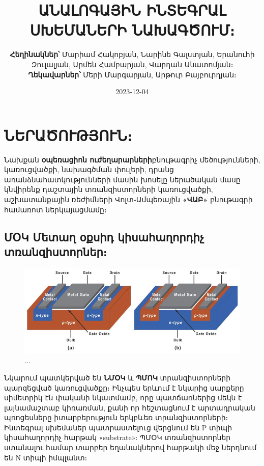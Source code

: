 \documentclass[
]{book}
\title{ԱՆԱԼՈԳԱՅԻՆ ԻՆՏԵԳՐԱԼ ՍԽԵՄԱՆԵՐԻ ՆԱԽԱԳԾՈՒՄ։}
\author{\textbf{Հեղինակներ՝} Մարիամ Հակոբյան, Նարինե Գալստյան, Երանուհի
Զուլալյան, Արմեն Համբարյան, Վարդան Անատոմյան։ \textbf{Ղեկավարներ՝} Մերի
Մարգարյան, Արթուր Բայբուրդյան։}
\date{2023-12-04}
\begin{document}
\frontmatter
\maketitle

\mainmatter
\hypertarget{ux576ux565ux580ux561ux56eux578ux582ux569ux575ux578ux582ux576}{%
\chapter{ՆԵՐԱԾՈՒԹՅՈՒՆ։}\label{ux576ux565ux580ux561ux56eux578ux582ux569ux575ux578ux582ux576}}

Նախքան \textbf{օպեռացիոն ուժեղարարների}բնութագրիչ մեծությունների,
կառուցվածքի, նախագծման փուլերի, դրանց առանձնահատկությունների մասին
խոսելը ներածական մասը կնվիրենք դաշտային տռանզիստորների կառուցվածքի,
աշխատանքային ռեժիմների Վոլտ֊Ամպեռային \textbf{«ՎԱԲ»} բնութագրի համառոտ
ներկայացմամը։

\hypertarget{ux574ux585ux56f-ux574ux565ux57fux561ux572-ux585ux584ux57dux56bux564-ux56fux56bux57dux561ux570ux561ux572ux578ux580ux564ux56bux579-ux57fux57cux561ux576ux566ux56bux57dux57fux578ux580ux576ux565ux580}{%
\section{ՄՕԿ Մետաղ օքսիդ կիսահաղորդիչ
տռանզիստորներ։}\label{ux574ux585ux56f-ux574ux565ux57fux561ux572-ux585ux584ux57dux56bux564-ux56fux56bux57dux561ux570ux561ux572ux578ux580ux564ux56bux579-ux57fux57cux561ux576ux566ux56bux57dux57fux578ux580ux576ux565ux580}}

\begin{figure}

{\centering \includegraphics[width=1\linewidth]{imige/mostex} 

}

\caption{...}\label{fig:unnamed-chunk-1}
\end{figure}

Նկարում պատկերված են \textbf{ՆՄՕԿ} և \textbf{ՊՄՈԿ} տրանզիստորների
պարզեցված կառուցվածքը։ Ինչպես երևում է նկարից սարքերը սիմետրիկ էն փականի
նկատմամբ, որը պատճառներից մեկն է լայնամաշտաբ կիռառման, քանի որ
հեշտացնում է արտադրական պռոցեսները իտարբերություն երկբևեռ
տրանզիստորների։ Ինտեգրալ սխեմաներ պատրաստելուց վերցնում են P տիպի
կիսահաղորդիչ հարթակ «substrate»: ՊՄՕԿ տռանզիստորներ ստանալու համար
տարբեր եղանակներով հարթակի մեջ ներդնում են N տիպի իմպլանտ։
\end{document}
